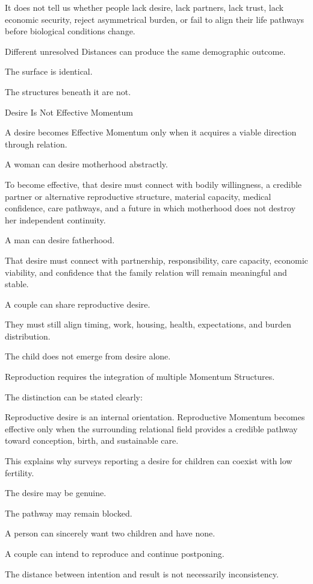 It does not tell us whether people lack desire, lack partners, lack trust, lack economic security, reject asymmetrical burden, or fail to align their life pathways before biological conditions change.

Different unresolved Distances can produce the same demographic outcome.

The surface is identical.

The structures beneath it are not.

Desire Is Not Effective Momentum

A desire becomes Effective Momentum only when it acquires a viable direction through relation.

A woman can desire motherhood abstractly.

To become effective, that desire must connect with bodily willingness, a credible partner or alternative reproductive structure, material capacity, medical confidence, care pathways, and a future in which motherhood does not destroy her independent continuity.

A man can desire fatherhood.

That desire must connect with partnership, responsibility, care capacity, economic viability, and confidence that the family relation will remain meaningful and stable.

A couple can share reproductive desire.

They must still align timing, work, housing, health, expectations, and burden distribution.

The child does not emerge from desire alone.

Reproduction requires the integration of multiple Momentum Structures.

The distinction can be stated clearly:

Reproductive desire is an internal orientation. Reproductive Momentum becomes effective only when the surrounding relational field provides a credible pathway toward conception, birth, and sustainable care.

This explains why surveys reporting a desire for children can coexist with low fertility.

The desire may be genuine.

The pathway may remain blocked.

A person can sincerely want two children and have none.

A couple can intend to reproduce and continue postponing.

The distance between intention and result is not necessarily inconsistency.

